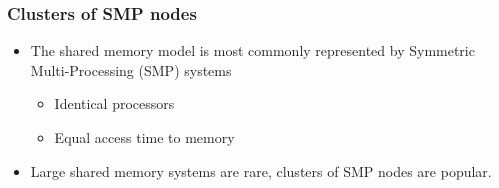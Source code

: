 \documentclass[10pt,t]{beamer}
\begin{document}
\begin{frame}
  \frametitle{Clusters of SMP nodes}
  \begin{itemize}
    \item The shared memory model is most commonly represented by Symmetric Multi-Processing (SMP) systems
    \begin{itemize}
      \item Identical processors
      \item Equal access time to memory
    \end{itemize}
    \item Large shared memory systems are rare, clusters of SMP nodes are popular.
  \end{itemize}

  
\end{frame}
\end{document}
